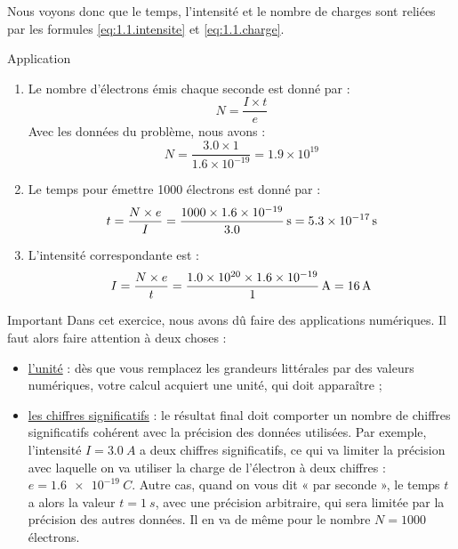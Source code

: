 \documentclass[10pt,a5paper,notitlepage]{book}
\begin{document}
Nous voyons donc que le temps, l'intensité et le nombre de charges sont reliées
par les formules \ref{eq:1.1.intensite} et \ref{eq:1.1.charge}.

\begin{NCexem}{Application}
	\begin{enumerate}
		\item Le nombre d'électrons émis chaque seconde est donné par :
		\begin{equation}
			N = \frac{I \times t}{e}
		\end{equation}
		Avec les données du problème, nous avons :
		\begin{equation}
			N = \dfrac{3.0 \times 1}{1.6\times 10^{-19}} = 1.9\times 10^{19}
		\end{equation}
		\item Le temps pour émettre 1000 électrons est donné par :
		\begin{equation}
            t = \dfrac{N\times e}{I} = \dfrac{1000 \times 1.6\times
            10^{-19}}{3.0}\,{\rm s} = \SI{5.3e-17}{s}
		\end{equation}
		\item L'intensité correspondante est :
		\begin{equation}
            I = \dfrac{N\times e}{t} = \dfrac{1.0\times 10^{20} \times 1.6\times
            10^{-19}}{1}\,{\rm A} = \SI{16}{A}
		\end{equation}
	\end{enumerate}
\end{NCexem}

\begin{impo}{Important}
    Dans cet exercice, nous avons dû faire des applications numériques. Il faut
    alors faire attention à deux choses :
	\begin{itemize}
        \item \underline{l'unité} : dès que vous remplacez les grandeurs
            littérales par des valeurs numériques, votre calcul acquiert une
            unité, qui doit apparaître ;
        \item \underline{les chiffres significatifs} : le résultat final doit
            comporter un nombre de chiffres significatifs cohérent avec la
            précision des données utilisées. Par exemple, l'intensité $I =
            \SI{3.0}{A}$ a deux chiffres significatifs, ce qui va limiter la
            précision avec laquelle on va utiliser la charge de l'électron à
            deux chiffres : $e = \SI{1.6e-19}{C}$. Autre cas, quand on vous dit
            « par seconde », le temps $t$ a alors la valeur $t = \SI{1}{s}$, avec
            une précision arbitraire, qui sera limitée par la précision des
            autres données. Il en va de même pour le nombre $N = 1000$
            électrons.
	\end{itemize}
\end{impo}
\end{document}
